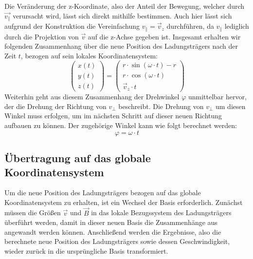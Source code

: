 Die Ver\"anderung der z-Koordinate, also der Anteil der Bewegung, welcher durch \(\vec{v_\parallel}\) verursacht wird, l\"asst sich
direkt mithilfe  bestimmen. Auch hier l\"asst sich aufgrund der Konstruktion die Vereinfachung
\(v_\parallel = \vec{v}_z\) durchf\"uhren, da \(v_\parallel\) lediglich durch die Projektion von \(\vec{v}\) auf die z-Achse gegeben ist.
Insgesamt erhalten wir folgenden Zusammenhang \"uber die neue Position des
Ladungstr\"agers nach der Zeit \(t\), bezogen auf sein lokales Koordinatensystem:
\begin{equation}
  \begin{pmatrix}
    x(t) \\
    y(t) \\
    z(t)
  \end{pmatrix}
  =
  \begin{pmatrix}
    r \cdot \sin{\left(\omega \cdot t\right)} - r \\
    r \cdot \cos{\left(\omega \cdot t\right)} \\
    \vec{v}_z \cdot t
  \end{pmatrix}
\end{equation}
Weiterhin geht aus diesem Zusammenhang der Drehwinkel \(\varphi\) unmittelbar hervor, der die Drehung der Richtung von \(v_\perp\)
beschreibt. Die Drehung von \(v_\perp\) um diesen Winkel muss erfolgen, um im n\"achsten Schritt auf dieser neuen Richtung aufbauen
zu k\"onnen. Der zugeh\"orige Winkel kann wie folgt berechnet werden:
\begin{equation}
  \label{eq:phi}
  \varphi = \omega \cdot t
\end{equation}

\subsection{\"Ubertragung auf das globale Koordinatensystem}

Um die neue Position des Ladungstr\"agers bezogen auf das globale Koordinatensystem zu erhalten, ist ein Wechsel der Basis erforderlich.
Zun\"achst m\"ussen die Gr\"o{\ss}en \(\vec{v}\) und \(\vec{B}\) in das lokale Bezugssystem des Ladungstr\"agers \"uberf\"uhrt werden,
damit in dieser neuen Basis die Zusammenh\"ange aus  angewandt werden k\"onnen. Anschlie{\ss}end werden
die Ergebnisse, also die berechnete neue Position des Ladungstr\"agers sowie dessen Geschwindigkeit, wieder zur\"uck in die
urspr\"ungliche Basis transformiert.

